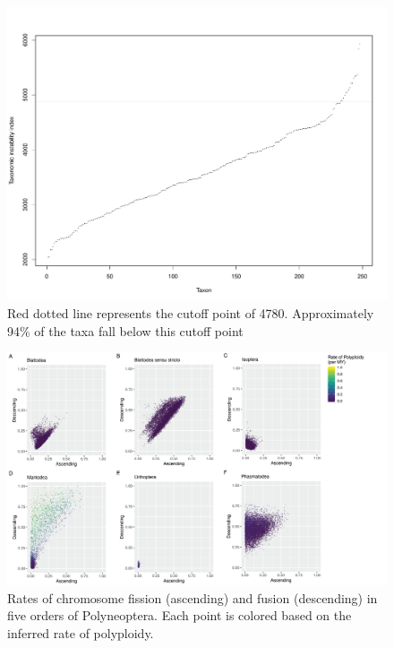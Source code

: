 \begin{figure}
\centering \includegraphics[width=.5\textwidth]{figures/taxonomic_instability_index_plot.pdf}
\caption{
Red dotted line represents the cutoff point of 4780. Approximately 94\% of the taxa fall below this cutoff point
}
\label{fig:tax.index}
\end{figure}

\begin{figure}
\centering \includegraphics[width=1\textwidth]{figures/rate_estimates.jpg}
\caption{
Rates of chromosome fission (ascending) and fusion (descending) in five orders of Polyneoptera. Each point is colored based on the inferred rate of polyploidy. 
}
\label{fig:rates}
\end{figure}

